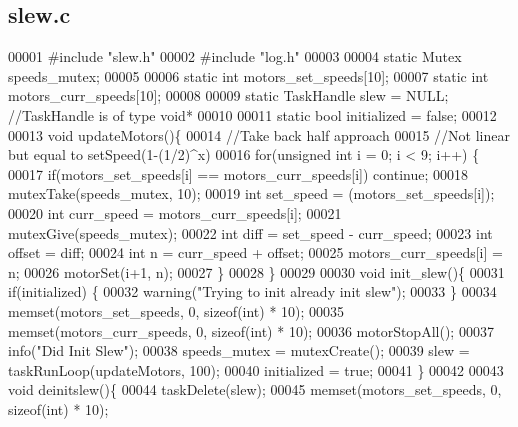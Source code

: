 \subsection{slew.\+c}
\label{slew_8c_source}

\begin{DoxyCode}
00001 \textcolor{preprocessor}{#include "slew.h"}
00002 \textcolor{preprocessor}{#include "log.h"}
00003 
00004 \textcolor{keyword}{static} Mutex speeds_mutex;
00005 
00006 \textcolor{keyword}{static} \textcolor{keywordtype}{int} motors_set_speeds[10];
00007 \textcolor{keyword}{static} \textcolor{keywordtype}{int} motors_curr_speeds[10];
00008 
00009 \textcolor{keyword}{static} TaskHandle slew = NULL; \textcolor{comment}{//TaskHandle is of type void*}
00010 
00011 \textcolor{keyword}{static} \textcolor{keywordtype}{bool} initialized = \textcolor{keyword}{false};
00012 
00013 \textcolor{keywordtype}{void} updateMotors()\{
00014   \textcolor{comment}{//Take back half approach}
00015   \textcolor{comment}{//Not linear but equal to setSpeed(1-(1/2)^x)}
00016   \textcolor{keywordflow}{for}(\textcolor{keywordtype}{unsigned} \textcolor{keywordtype}{int} i = 0; i < 9; i++) \{
00017     \textcolor{keywordflow}{if}(motors_set_speeds[i] == motors_curr_speeds[i]) \textcolor{keywordflow}{continue};
00018     mutexTake(speeds_mutex, 10);
00019     \textcolor{keywordtype}{int} set\_speed = (motors_set_speeds[i]);
00020     \textcolor{keywordtype}{int} curr\_speed = motors_curr_speeds[i];
00021     mutexGive(speeds_mutex);
00022     \textcolor{keywordtype}{int} diff = set\_speed - curr\_speed;
00023     \textcolor{keywordtype}{int} offset = diff;
00024     \textcolor{keywordtype}{int} n = curr\_speed + offset;
00025     motors_curr_speeds[i] = n;
00026     motorSet(i+1, n);
00027   \}
00028 \}
00029 
00030 \textcolor{keywordtype}{void} init_slew()\{
00031   \textcolor{keywordflow}{if}(initialized) \{
00032     warning(\textcolor{stringliteral}{"Trying to init already init slew"});
00033   \}
00034   memset(motors_set_speeds, 0, \textcolor{keyword}{sizeof}(\textcolor{keywordtype}{int}) * 10);
00035   memset(motors_curr_speeds, 0, \textcolor{keyword}{sizeof}(\textcolor{keywordtype}{int}) * 10);
00036   motorStopAll();
00037   info(\textcolor{stringliteral}{"Did Init Slew"});
00038   speeds_mutex = mutexCreate();
00039   slew = taskRunLoop(updateMotors, 100);
00040   initialized = \textcolor{keyword}{true};
00041 \}
00042 
00043 \textcolor{keywordtype}{void} deinitslew()\{
00044   taskDelete(slew);
00045   memset(motors_set_speeds, 0, \textcolor{keyword}{sizeof}(\textcolor{keywordtype}{int}) * 10);

\end{DoxyCode}
